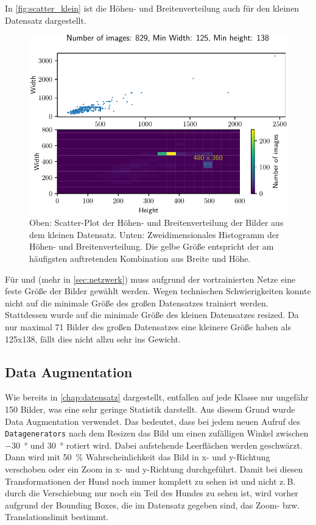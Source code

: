In \autoref{fig:scatter_klein} ist die Höhen- und Breitenverteilung auch für
den kleinen Datensatz dargestellt.

\begin{figure}
  \centering
  \includegraphics[scale=0.9]{pics/width_height_scatter_hist2d_klein.pdf}
  \caption{Oben: Scatter-Plot der Höhen- und Breitenverteilung der Bilder aus
  dem kleinen Datensatz.
  Unten: Zweidimensionales Histogramm der Höhen- und Breitenverteilung.
  Die gelbe Größe entspricht der am häufigsten auftretenden Kombination
  aus Breite und Höhe.}
  \label{fig:scatter_klein}
\end{figure}

Für \PreDog und \PreBig (mehr in \autoref{sec:netzwerk}) muss aufgrund der
vortrainierten Netze eine feste Größe der Bilder gewählt werden. Wegen
technischen Schwierigkeiten konnte nicht auf die minimale Größe des großen
Datensatzes trainiert  werden. Stattdessen wurde auf die minimale Größe des
kleinen Datensatzes resized. Da nur maximal 71 Bilder des großen Datensatzes
eine kleinere Größe haben als 125x138, fällt dies nicht allzu sehr ins Gewicht.

\subsection{Data Augmentation}
Wie bereits in \autoref{chap:datensatz} dargestellt, entfallen auf jede Klasse
nur ungefähr 150 Bilder, was eine sehr geringe Statistik darstellt. Aus diesem
Grund wurde Data Augmentation verwendet. Das bedeutet, dass bei jedem neuen
Aufruf des \texttt{Datagenerators} nach dem Resizen das Bild um einen zufälligen
Winkel zwischen \SI{-30}{\degree} und \SI{30}{\degree} rotiert wird. Dabei
aufstehende Leerflächen werden geschwärzt. Dann wird mit \SI{50}{\percent}
Wahrscheinlichkeit das Bild in x- und y-Richtung verschoben oder ein Zoom in x-
und y-Richtung durchgeführt. Damit bei diesen Transformationen der Hund noch
immer komplett zu sehen ist und nicht z.\,B. durch die Verschiebung nur noch ein
Teil des Hundes zu sehen ist, wird vorher aufgrund der Bounding Boxes, die im
Datensatz gegeben sind, das Zoom- bzw. Translationslimit bestimmt.

